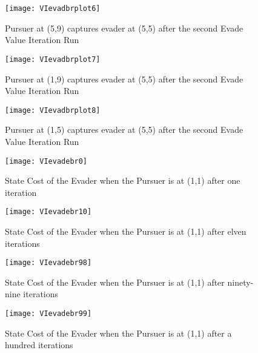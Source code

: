 \begin{figure}
\vspace{2.4in}
\centering
\texttt{[image: VIevadbrplot6]}
\caption{Pursuer at (5,9) captures evader at (5,5) after the second Evade Value Iteration Run}
\label{VIevadbrplot6}
\end{figure}
\clearpage
\newpage

\begin{figure}
\vspace{2.4in}
\centering
\texttt{[image: VIevadbrplot7]}
\caption{Pursuer at (1,9) captures evader at (5,5) after the second Evade Value Iteration Run}
\label{VIevadbrplot7}
\end{figure}
\clearpage
\newpage

\begin{figure}
\vspace{2.4in}
\centering
\texttt{[image: VIevadbrplot8]}
\caption{Pursuer at (1,5) captures evader at (5,5) after the second Evade Value Iteration Run}
\label{VIevadbrplot8}
\end{figure}
\clearpage
\newpage

\begin{figure}
\vspace{2.4in}
\centering
\texttt{[image: VIevadebr0]}
\caption{State Cost of the Evader when the Pursuer is at (1,1) after one iteration}
\label{VIevadebr0}
\end{figure}
\clearpage
\newpage

\begin{figure}
\vspace{2.4in}
\centering
\texttt{[image: VIevadebr10]}
\caption{State Cost of the Evader when the Pursuer is at (1,1) after elven iterations}
\label{VIevadebr10}
\end{figure}
\clearpage
\newpage

\begin{figure}
\vspace{2.4in}
\centering
\texttt{[image: VIevadebr98]}
\caption{State Cost of the Evader when the Pursuer is at (1,1) after ninety-nine iterations}
\label{VIevadebr98}
\end{figure}
\clearpage
\newpage

\begin{figure}
\vspace{2.4in}
\centering
\texttt{[image: VIevadebr99]}
\caption{State Cost of the Evader when the Pursuer is at (1,1) after a hundred iterations}
\label{VIevadebr99}
\end{figure}
\clearpage
\newpage

